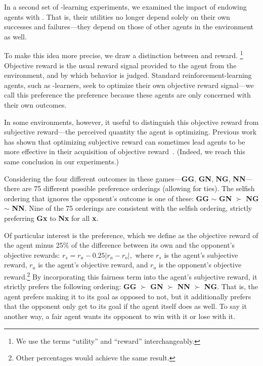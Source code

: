 
In a second set of \Q-learning experiments, we examined the impact of
endowing agents with . That is, their
utilities no longer depend solely on their own successes and
failures---they depend on those of other agents in the environment as
well.

To make this idea more precise, we draw a distinction
between  and  reward.%
\footnote{We use the terms ``utility'' and ``reward'' interchangeably.}  
Objective reward is the usual reward
signal provided to the agent from the environment, and by which
behavior is judged. Standard reinforcement-learning agents, such
as \Q-learners, seek to optimize their own objective reward
signal---we call this preference the  preference
because these agents are only concerned with their own outcomes.

In some environments, however, it useful to distinguish this objective
reward from subjective reward---the perceived quantity the agent is
optimizing. Previous work has shown that optimizing subjective reward
can sometimes lead agents to be more effective in their acquisition of
objective reward~\cite{singh2009rewards}.  (Indeed, we reach this same
conclusion in our experiments.)

Considering the four different outcomes in these games---{\bf GG},
{\bf GN}, {\bf NG}, {\bf NN}---there are 75 different possible
preference orderings (allowing for ties). The selfish ordering that
ignores the opponent's outcome is one of these:
{\bf GG} $\sim$ {\bf GN} $\succ$ {\bf NG} $\sim$ {\bf NN}.
Nine of the 75 orderings are consistent with the selfish ordering,
strictly preferring {\bf Gx} to {\bf Nx} for all {\bf x}.

Of particular interest is the  preference, which we define
as the objective reward of the agent minus 25\% of the difference
between its own and the opponent's objective rewards:
$r_{s} = r_{a} - 0.25 \left| r_{a} - r_{o} \right|,$ where $r_{s}$
is the agent's subjective reward, $r_{a}$ is the agent's objective
reward, and $r_{o}$ is the opponent's objective reward.\footnote{Other
percentages would achieve the same result.}  By incorporating this
fairness term into the agent's subjective reward, it strictly prefers
the following ordering:
{\bf GG} $\succ$ \mbox{\bf GN} $\succ$ \mbox {\bf NN} $\succ$ {\bf NG}.
That is, the agent prefers making it to its goal as opposed to not,
but it additionally prefers that the opponent only get to its goal if
the agent itself does as well. To say it another way, a fair agent
wants its opponent to win with it or lose with it.

